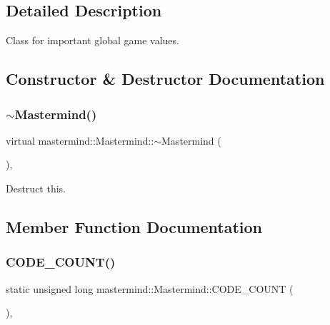 \subsection{Detailed Description}
Class for important global game values. 

\subsection{Constructor \& Destructor Documentation}
\hypertarget{classmastermind_1_1_mastermind_ac7d104e1c2febabb8d819de2ba447487}{}\label{classmastermind_1_1_mastermind_ac7d104e1c2febabb8d819de2ba447487} 
\subsubsection{\texorpdfstring{$\sim$\+Mastermind()}{~Mastermind()}}
{\footnotesize\ttfamily virtual mastermind\+::\+Mastermind\+::$\sim$\+Mastermind (\begin{DoxyParamCaption}{ }\end{DoxyParamCaption})\hspace{0.3cm}{\ttfamily [inline]}, {\ttfamily [virtual]}}



Destruct this. 



\subsection{Member Function Documentation}
\hypertarget{classmastermind_1_1_mastermind_af22130e134506ecb5e756b931e759a03}{}\label{classmastermind_1_1_mastermind_af22130e134506ecb5e756b931e759a03} 
\subsubsection{\texorpdfstring{C\+O\+D\+E\+\_\+\+C\+O\+U\+N\+T()}{CODE\_COUNT()}}
{\footnotesize\ttfamily static unsigned long mastermind\+::\+Mastermind\+::\+C\+O\+D\+E\+\_\+\+C\+O\+U\+NT (\begin{DoxyParamCaption}{ }\end{DoxyParamCaption})\hspace{0.3cm}{\ttfamily [inline]}, {\ttfamily [static]}}



